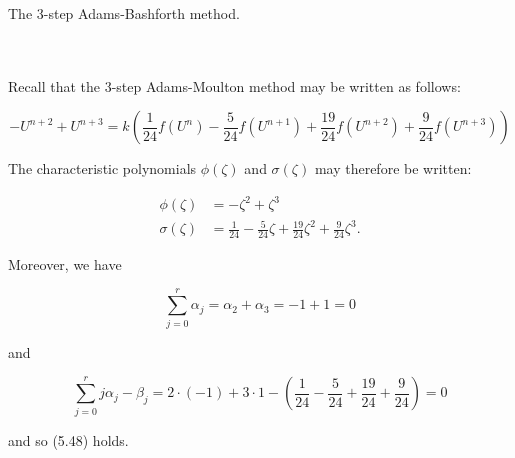 The 3-step Adams-Bashforth method.

\begin{solution}\ \\\\
    Recall that the 3-step Adams-Moulton method may be written as follows:

    $$
    -U^{n+2} + U^{n+3} = k \left(\frac{1}{24} f(U^n) - \frac{5}{24} f(U^{n+1}) + \frac{19}{24} f(U^{n+2}) + \frac{9}{24} f(U^{n+3}) \right)
    $$

    The characteristic polynomials $\phi(\zeta)$ and $\sigma(\zeta)$ may therefore be written:

    \begin{align*}
        \phi(\zeta)   &= -\zeta^2 + \zeta^3 \\
        \sigma(\zeta) &= \frac{1}{24} - \frac{5}{24} \zeta + \frac{19}{24} \zeta^2  + \frac{9}{24} \zeta^3.
    \end{align*}

    Moreover, we have 
    
    $$
    \sum\limits_{j=0}^{r}{\alpha_j = \alpha_2 + \alpha_3} = -1 + 1 = 0
    $$

    and 
    
    $$
    \sum\limits_{j=0}^{r}{j \alpha_j - \beta_j} = 2 \cdot (-1) + 3 \cdot 1 - \left(\frac{1}{24} - \frac{5}{24} + \frac{19}{24} + \frac{9}{24} \right) = 0
    $$

    and so (5.48) holds.

    \ \\
\end{solution}